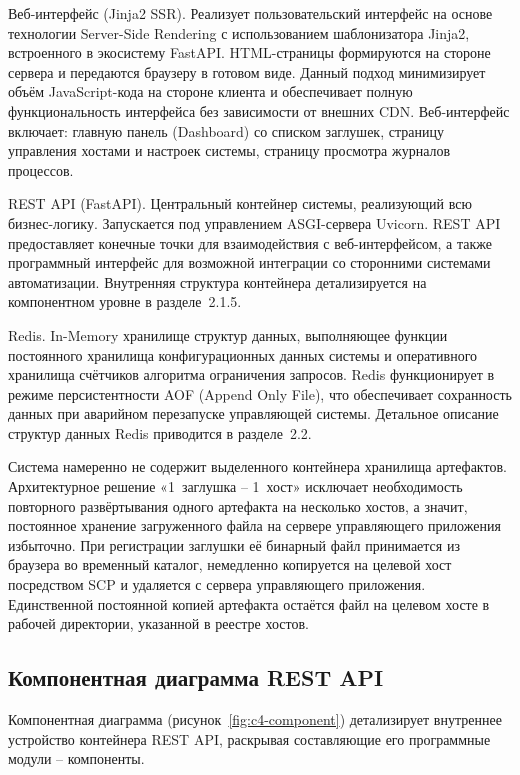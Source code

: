 Веб-интерфейс (Jinja2 SSR). Реализует пользовательский интерфейс на основе технологии Server-Side Rendering с использованием шаблонизатора Jinja2, встроенного в экосистему FastAPI. HTML-страницы формируются на стороне сервера и передаются браузеру в готовом виде. Данный подход минимизирует объём JavaScript-кода на стороне клиента и обеспечивает полную функциональность интерфейса без зависимости от внешних CDN. Веб-интерфейс включает: главную панель (Dashboard) со списком заглушек, страницу управления хостами и настроек системы, страницу просмотра журналов процессов.

REST API (FastAPI). Центральный контейнер системы, реализующий всю бизнес-логику. Запускается под управлением ASGI-сервера Uvicorn. REST API предоставляет конечные точки для взаимодействия с веб-интерфейсом, а также программный интерфейс для возможной интеграции со сторонними системами автоматизации. Внутренняя структура контейнера детализируется на компонентном уровне в разделе~2.1.5.

Redis. In-Memory хранилище структур данных, выполняющее функции постоянного хранилища конфигурационных данных системы и оперативного хранилища счётчиков алгоритма ограничения запросов. Redis функционирует в режиме персистентности AOF (Append Only File), что обеспечивает сохранность данных при аварийном перезапуске управляющей системы. Детальное описание структур данных Redis приводится в разделе~2.2.

Система намеренно не содержит выделенного контейнера хранилища артефактов. Архитектурное решение «1~заглушка -- 1~хост» исключает необходимость повторного развёртывания одного артефакта на несколько хостов, а значит, постоянное хранение загруженного файла на сервере управляющего приложения избыточно. При регистрации заглушки её бинарный файл принимается из браузера во временный каталог, немедленно копируется на целевой хост посредством SCP и удаляется с сервера управляющего приложения. Единственной постоянной копией артефакта остаётся файл на целевом хосте в рабочей директории, указанной в реестре хостов.

\subsection{Компонентная диаграмма REST API}

Компонентная диаграмма (рисунок~\ref{fig:c4-component}) детализирует внутреннее устройство контейнера REST API, раскрывая составляющие его программные модули -- компоненты.

